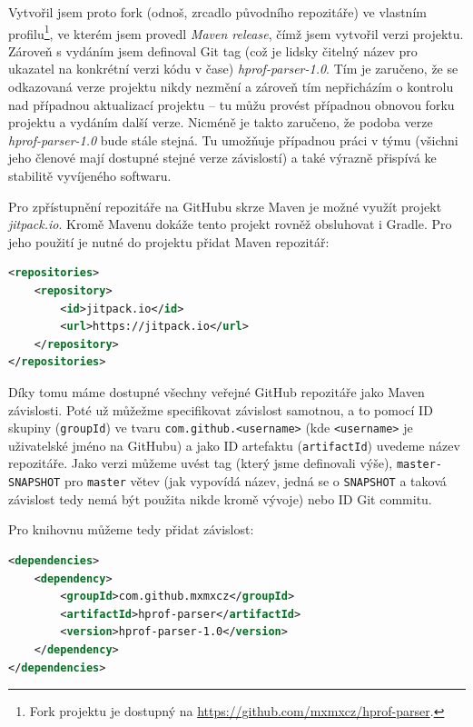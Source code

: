 Vytvořil jsem proto fork (odnoš, zrcadlo původního repozitáře) ve vlastním profilu\footnote{Fork projektu je dostupný na \url{https://github.com/mxmxcz/hprof-parser}.}, ve kterém jsem provedl \textit{Maven release}, čímž jsem vytvořil verzi projektu. Zároveň s vydáním jsem definoval Git tag (což je lidsky čitelný název pro ukazatel na konkrétní verzi kódu v čase) \textit{hprof-parser-1.0}. Tím je zaručeno, že se odkazovaná verze projektu nikdy nezmění a zároveň tím nepřicházím o kontrolu nad případnou aktualizací projektu -- tu můžu provést případnou obnovou forku projektu a vydáním další verze. Nicméně je takto zaručeno, že podoba verze \textit{hprof-parser-1.0} bude stále stejná. Tu umožňuje případnou práci v týmu (všichni jeho členové mají dostupné stejné verze závislostí) a také výrazně přispívá ke stabilitě vyvíjeného softwaru.

Pro zpřístupnění repozitáře na GitHubu skrze Maven je možné využít projekt \textit{jitpack.io}. Kromě Mavenu dokáže tento projekt rovněž obsluhovat i Gradle. Pro jeho použití je nutné do projektu přidat Maven repozitář:

\begin{lstlisting}[caption={Definování Jitpack repozitáře v Mavenu}, frame={single}, language={xml}, float,floatplacement=H]
<repositories>
    <repository>
        <id>jitpack.io</id>
        <url>https://jitpack.io</url>
    </repository>
</repositories>
\end{lstlisting}

Díky tomu máme dostupné všechny veřejné GitHub repozitáře jako Maven závislosti. Poté už můžežme specifikovat závislost samotnou, a to pomocí ID skupiny (\texttt{groupId}) ve tvaru \texttt{com.github.<username>} (kde \texttt{<username>} je uživatelské jméno na GitHubu) a jako ID artefaktu (\texttt{artifactId}) uvedeme název repozitáře. Jako verzi můžeme uvést tag (který jsme definovali výše), \texttt{master-SNAPSHOT} pro \texttt{master} větev (jak vypovídá název, jedná se o \texttt{SNAPSHOT} a taková závislost tedy nemá být použita nikde kromě vývoje) nebo ID Git commitu.

Pro knihovnu můžeme tedy přidat závislost:

\begin{lstlisting}[caption={Definování závislosti v Mavenu}, frame={single}, language={xml}, float,floatplacement=H]
<dependencies>
    <dependency>
        <groupId>com.github.mxmxcz</groupId>
        <artifactId>hprof-parser</artifactId>
        <version>hprof-parser-1.0</version>
    </dependency>
</dependencies>
\end{lstlisting}

